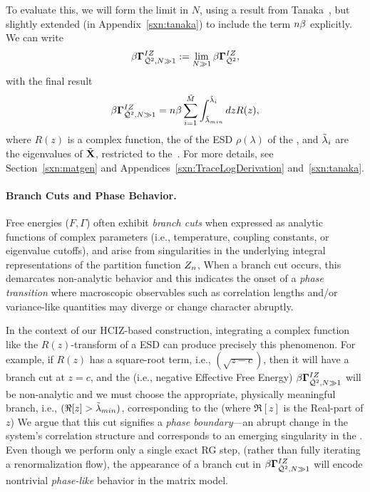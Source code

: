To evaluate this, we will form the \LargeN limit in $N$, using a result from Tanaka~\cite{Tanaka2007,Tanaka2008},
but slightly extended (in Appendix~\ref{sxn:tanaka}) to include the term $n\beta$ explicitly.
We can write
\begin{align}
  \label{eqn:izgin_def}
  \beta\mathbf{\Gamma}^{IZ}_{\bar{\mathcal{Q}}^{2},N\gg 1}:=\lim_{N\gg 1}\beta\mathbf{\Gamma}^{IZ}_{\bar{\mathcal{Q}}^{2}} ,
\end{align}
with the final result
  \begin{align}
    \label{eqn:hciz_tanaka}
    \beta\mathbf{\Gamma}^{IZ}_{\bar{\mathcal{Q}}^{2},N\gg 1}=n\beta\sum_{i=1}^{\tilde{M}}\int^{\tilde{\lambda}_{i}}_{{\tilde{\lambda}_{min}}} dz R(z) ,
\end{align}
where $R(z)$ is a complex function, the \RTransform of the ESD $\rho(\lambda)$ of the \Teacher, and $\tilde{\lambda}_{i}$ are the eigenvalues of \Teacher \CorrelationMatrix $\tilde{\mathbf{X}}$, restricted to the~\ECS.
For more details, see Section~\ref{sxn:matgen} and Appendices~\ref{sxn:TraceLogDerivation} and~\ref{sxn:tanaka}.

\paragraph{Branch Cuts and Phase Behavior.}
Free energies ($F,\Gamma$) often exhibit \emph{branch cuts} when expressed as analytic functions 
of complex parameters (i.e., temperature, coupling constants, or eigenvalue cutoffs),
and arise from singularities in the underlying integral representations of the partition function $Z_{n}$,
When a branch cut occurs, this demarcates non-analytic behavior
and this indicates the onset of a \emph{phase transition} where
macroscopic observables such as correlation lengths and/or variance-like quantities
may diverge or change character abruptly.  

In the context of our HCIZ-based construction, integrating a complex function like the $R(z)$-transform of
a \HeavyTailed ESD can produce precisely this phenomenon.
For example, if $R(z)$ has a square-root term, i.e., $(\sqrt{z-c})$, then it will have a branch cut at $z=c$,
and the \GeneratingFunction (i.e.,  negative Effective Free Energy) $\beta\mathbf{\Gamma}^{IZ}_{\bar{\mathcal{Q}}^{2},N\gg 1}$
will be non-analytic and we must choose the appropriate, physically meaningful branch, i.e., $(\Re[z]>{\tilde{\lambda}_{min}})$,
corresponding to the \ECS (where $\Re[z]$ is the Real-part of $z$)
We argue that this cut signifies a \emph{phase boundary}—an abrupt change
in the system’s correlation structure and corresponds to an emerging singularity in the \LayerQuality.
Even though we perform only a single exact RG step, 
(rather than fully iterating a renormalization flow), the appearance of a branch cut in $\beta\mathbf{\Gamma}^{IZ}_{\bar{\mathcal{Q}}^{2},N\gg 1}$ will encode
nontrivial \emph{phase-like} behavior in the \SETOL \HeavyTailed matrix model.
